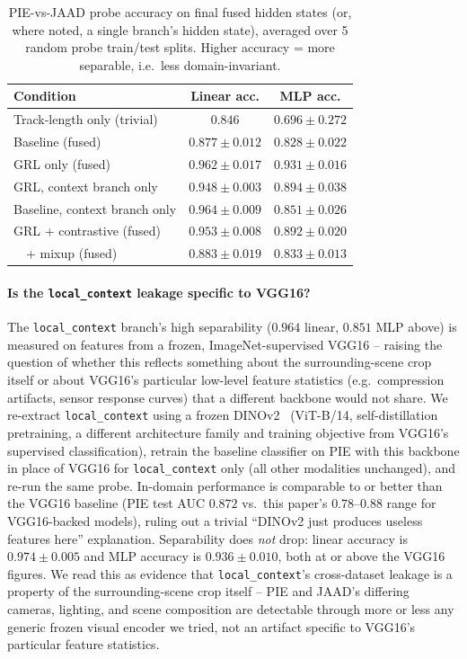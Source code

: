 \begin{table}[t]
\centering
\caption{PIE-vs-JAAD probe accuracy on final fused hidden states (or,
where noted, a single branch's hidden state), averaged over 5 random
probe train/test splits. Higher accuracy = more separable, i.e.\ less
domain-invariant.}
\label{tab:probe}
\begin{tabular}{lcc}
\toprule
Condition & Linear acc. & MLP acc. \\
\midrule
Track-length only (trivial) & $0.846$ & $0.696\pm0.272$ \\
Baseline (fused) & $0.877\pm0.012$ & $0.828\pm0.022$ \\
GRL only (fused) & $0.962\pm0.017$ & $0.931\pm0.016$ \\
GRL, context branch only & $0.948\pm0.003$ & $0.894\pm0.038$ \\
Baseline, context branch only & $0.964\pm0.009$ & $0.851\pm0.026$ \\
GRL + contrastive (fused) & $0.953\pm0.008$ & $0.892\pm0.020$ \\
\ \ + mixup (fused) & $0.883\pm0.019$ & $0.833\pm0.013$ \\
\bottomrule
\end{tabular}
\end{table}

\paragraph{Is the \texttt{local\_context} leakage specific to VGG16?}
The \texttt{local\_context} branch's high separability
($0.964$ linear, $0.851$ MLP above) is measured on features from a
frozen, ImageNet-supervised VGG16 -- raising the question of whether
this reflects something about the surrounding-scene crop itself or
about VGG16's particular low-level feature statistics (e.g.\
compression artifacts, sensor response curves) that a different
backbone would not share. We re-extract \texttt{local\_context} using
a frozen DINOv2~\cite{dinov2} (ViT-B/14, self-distillation pretraining,
a different architecture family and training objective from VGG16's
supervised classification), retrain the baseline classifier on PIE
with this backbone in place of VGG16 for \texttt{local\_context}
only (all other modalities unchanged), and re-run the same probe.
In-domain performance is comparable to or better than the VGG16
baseline (PIE test AUC $0.872$ vs.\ this paper's $0.78$--$0.88$ range
for VGG16-backed models), ruling out a trivial ``DINOv2 just produces
useless features here'' explanation. Separability does \emph{not}
drop: linear accuracy is $0.974\pm0.005$ and MLP accuracy is
$0.936\pm0.010$, both at or above the VGG16 figures. We read this as
evidence that \texttt{local\_context}'s cross-dataset leakage is a
property of the surrounding-scene crop itself -- PIE and JAAD's
differing cameras, lighting, and scene composition are detectable
through more or less any generic frozen visual encoder we tried, not
an artifact specific to VGG16's particular feature statistics.

